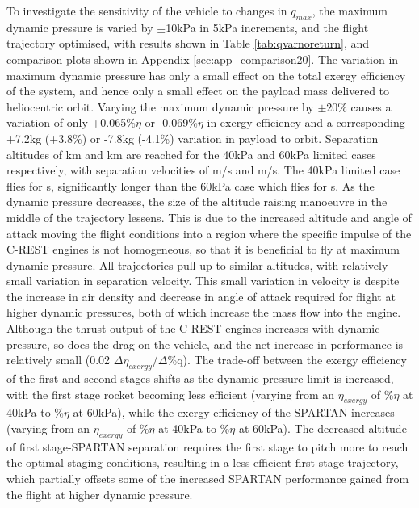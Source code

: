 To investigate the sensitivity of the vehicle to changes in $q_{max}$, the maximum dynamic pressure is varied by $\pm$10kPa in 5kPa increments, and the flight trajectory optimised, with results shown in Table \ref{tab:qvarnoreturn}, and comparison plots shown in Appendix \ref{sec:app_comparison20}.
The variation in maximum dynamic pressure has only a small effect on the total exergy efficiency of the system, and hence only a small effect on the payload mass delivered to heliocentric orbit.  Varying the maximum dynamic pressure by $\pm20\%$ causes a variation of only +0.065\%$\eta$ or -0.069\%$\eta$ in exergy efficiency and a corresponding +7.2kg (+3.8\%) or -7.8kg (-4.1\%) variation in payload to orbit.  
Separation altitudes of \secondthirdSeparationAltqFortyNoReturn km and \secondthirdSeparationAltqSixtyNoReturn km are reached for the 40kPa and 60kPa limited cases respectively, with separation velocities of \secondthirdSeparationvqFortyNoReturn m/s and \secondthirdSeparationvqSixtyNoReturn m/s. The 40kPa limited case flies for \secondFlightTimeqFortyNoReturn s, significantly longer than the 60kPa case which flies for \secondFlightTimeqSixtyNoReturn s.
As the dynamic pressure decreases, the size of the altitude raising manoeuvre in the middle of the trajectory lessens. This is due to the increased altitude and angle of attack moving the flight conditions into a region where the specific impulse of the C-REST engines is not homogeneous, so that it is beneficial to fly at maximum dynamic pressure.  
All trajectories pull-up to similar altitudes, with relatively small variation in separation velocity.
This small variation in velocity is despite the increase in air density and decrease in angle of attack required for flight at higher dynamic pressures, both of which increase the mass flow into the engine. Although the thrust output of the C-REST engines increases with dynamic pressure, so does the drag on the vehicle, and the net increase in performance is relatively small (0.02 $\Delta\eta_{exergy}$/$\Delta$\%q). 
The trade-off between the exergy efficiency of the first and second stages shifts as the dynamic pressure limit is increased, with the first stage rocket becoming less efficient (varying from an $\eta_{exergy}$ of \firstExergyEffqFortyNoReturn \%$\eta$ at 40kPa to \firstExergyEffqSixtyNoReturn \%$\eta$ at 60kPa), while the exergy efficiency of the SPARTAN increases (varying from an $\eta_{exergy}$ of \secondExergyEffqFortyNoReturn \%$\eta$ at 40kPa to \secondExergyEffqSixtyNoReturn \%$\eta$ at 60kPa). The decreased altitude of first stage-SPARTAN separation requires the first stage to pitch more to reach the optimal staging conditions, resulting in a less efficient first stage trajectory, which partially offsets some of the increased SPARTAN performance gained from the flight at higher dynamic pressure. 



